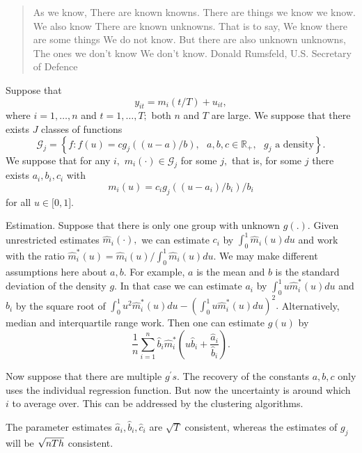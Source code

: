 \documentclass[12pt,a4paper]{article}
\begin{document}
\begin{quotation}
As we know, There are known knowns. There are things we know we know. We
also know There are known unknowns. That is to say, We know there are some
things We do not know. But there are also unknown unknowns, The ones we
don't know We don't know. Donald Rumsfeld, U.S. Secretary of Defence
\end{quotation}

Suppose that%
\begin{equation*}
y_{it}=m_{i}(t/T)+u_{it},
\end{equation*}%
where $i=1,\ldots ,n$ and $t=1,\ldots ,T;$ both $n$ and $T$ are large. We
suppose that there exists $J$ classes of functions%
\begin{equation*}
\mathcal{G}_{j}=\left\{ f:f(u)=cg_{j}((u-a)/b),\text{ }a,b,c\in \mathbb{R}%
_{+},\text{ }g_{j}\text{ a density}\right\} .
\end{equation*}%
We suppose that for any $i,$ $m_{i}(\cdot )\in \mathcal{G}_{j}$ for some $j,$
that is, for some $j$ there exists $a_{i},b_{i},c_{i}$ with%
\begin{equation*}
m_{i}(u)=c_{i}g_{j}((u-a_{i})/b_{i})/b_{i}
\end{equation*}%
for all $u\in \lbrack 0,1].$ 

Estimation. Suppose that there is only one group with unknown $g(.).$ Given
unrestricted estimates $\widehat{m}_{i}(\cdot ),$ we can estimate $c_{i}$ by 
$\int_{0}^{1}\widehat{m}_{i}(u)du$ and work with the ratio $\widehat{m}%
_{i}^{\ast }(u)=\widehat{m}_{i}(u)/\int_{0}^{1}\widehat{m}_{i}(u)du.$ We may
make different assumptions here about $a,b.$ For example, $a$ is the mean
and $b$ is the standard deviation of the density $g.$ In that case we can
estimate $a_{i}$ by $\int_{0}^{1}u\widehat{m}_{i}^{\ast }(u)du$ and $b_{i}$
by the square root of $\int_{0}^{1}u^{2}\widehat{m}_{i}^{\ast
}(u)du-(\int_{0}^{1}u\widehat{m}_{i}^{\ast }(u)du)^{2}.$ Alternatively,
median and interquartile range work. Then one can estimate $g(u)$ by 
\begin{equation*}
\frac{1}{n}\sum_{i=1}^{n}\widehat{b}_{i}\widehat{m}_{i}^{\ast }\left( u%
\widehat{b}_{i}+\frac{\widehat{a}_{i}}{\widehat{b}_{i}}\right) .
\end{equation*}

Now suppose that there are multiple $g^{\prime }s.$ The recovery of the
constants $a,b,c$ only uses the individual regression function. But now the
uncertainty is around which $i$ to average over. This can be addressed by
the clustering algorithms. 

The parameter estimates $\widehat{a}_{i},\widehat{b}_{i},\widehat{c}_{i}$
are $\sqrt{T}$ consistent, whereas the estimates of $g_{j}$ will be $\sqrt{%
nTh}$ consistent. 
\end{document}
